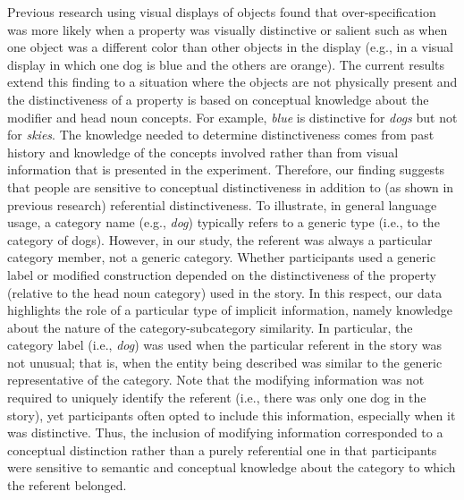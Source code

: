 \documentclass[output=paper]{langsci/langscibook}
\begin{document}
Previous research using visual displays of objects found that
over-specification was more likely when a property was visually
distinctive or salient such as when one object was a different color
than other objects in the display (e.g., in a visual display in which
one dog is blue and the others are orange). The current results extend
this finding to a situation where the objects are not physically
present and the distinctiveness of a property is based on conceptual
knowledge about the modifier and head noun concepts. For example,
\textit{blue} is distinctive for \textit{dogs} but not for
\textit{skies}.  The knowledge needed to determine distinctiveness
comes from past history and knowledge of the concepts involved rather
than from visual information that is presented in the experiment.
Therefore, our finding suggests that people are sensitive to
conceptual distinctiveness in addition to (as shown in previous
research) referential distinctiveness. To illustrate, in general
language usage, a category name (e.g., \textit{dog}) typically refers to a
generic type (i.e., to the category of dogs).  However, in our study,
the referent was always a particular category member, not a generic
category. Whether participants used a generic label or modified
construction depended on the distinctiveness of the property (relative
to the head noun category) used in the story. In this respect, our
data highlights the role of a particular type of implicit information,
namely knowledge about the nature of the category-subcategory
similarity. In particular, the category label (i.e., \textit{dog}) was used
when the particular referent in the story was not unusual; that is,
when the entity being described was similar to the generic
representative of the category. Note that the modifying information
was not required to uniquely identify the referent (i.e., there was
only one dog in the story), yet participants often opted to include
this information, especially when it was distinctive. Thus, the
inclusion of modifying information corresponded to a conceptual
distinction rather than a purely referential one in that participants
were sensitive to semantic and conceptual knowledge about the category
to which the referent belonged.
\end{document}
